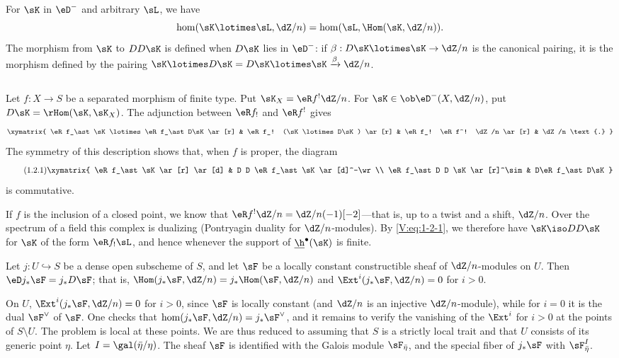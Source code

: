 \documentclass[oneside]{book}
\begin{document}
For $\sK$ in $\eD^-$ and arbitrary $\sL$, we have
\[
  \hom(\sK\lotimes \sL,\dZ/n) = \hom(\sL,\Hom(\sK,\dZ/n)) \text{.}
\]
The morphism from $\sK$ to $DD\sK$ is defined when $D\sK$ lies in $\eD^-$:
if $\beta:D\sK\lotimes\sK\to \dZ/n$ is the canonical pairing, it is the
morphism defined by the pairing
$\sK\lotimes D\sK=D\sK\lotimes \sK \xrightarrow\beta \dZ/n$.


\subsection{}\label{V:1-2}

Let $f:X\to S$ be a separated morphism of finite type. Put
$\sK_X=\eR f^!\dZ/n$. For $\sK\in \ob\eD^-(X,\dZ/n)$, put
$D\sK = \rHom(\sK,\sK_X)$. The adjunction between $\eR f_!$ and $\eR f^!$
gives
\[\xymatrix{
  \eR f_\ast \sK\lotimes \eR f_\ast D\sK \ar[r]
    & \eR f_! (\sK\lotimes D\sK) \ar[r]
    & \eR f_! \eR f^! \dZ/n \ar[r]
    & \dZ/n \text{.}
}\]
The symmetry of this description shows that, when $f$ is proper, the diagram
\begin{equation*}\tag{1.2.1}\label{V:eq:1-2-1}
\xymatrix{
  \eR f_\ast \sK \ar[r] \ar[d]
    & D D \eR f_\ast \sK \ar[d]^-\wr \\
  \eR f_\ast D D \sK \ar[r]^\sim
    & D\eR f_\ast D\sK
}
\end{equation*}
is commutative.

If $f$ is the inclusion of a closed point, we know that
$\eR f^!\dZ/n=\dZ/n(-1)[-2]$---that is, up to a twist and a shift, $\dZ/n$.
Over the spectrum of a field this complex is dualizing (Pontryagin duality
for $\dZ/n$-modules). By \eqref{V:eq:1-2-1}, we therefore have
$\sK\iso D D\sK$ for $\sK$ of the form $\eR f_!\sL$, and hence whenever the
support of $\underline\h^\bullet(\sK)$ is finite.


\begin{theorem_}\label{V:1-3}
Let $j:U\hookrightarrow S$ be a dense open subscheme of $S$, and let $\sF$
be a locally constant constructible sheaf of $\dZ/n$-modules on $U$. Then
$\eD j_\ast \sF = j_\ast D \sF$; that is,
$\Hom(j_\ast \sF,\dZ/n) = j_\ast\Hom(\sF,\dZ/n)$ and
$\Ext^i(j_\ast\sF,\dZ/n) = 0$ for $i>0$.
\end{theorem_}

On $U$, $\Ext^i(j_\ast\sF,\dZ/n)=0$ for $i>0$, since $\sF$ is locally
constant (and $\dZ/n$ is an injective $\dZ/n$-module), while for $i=0$ it is
the dual $\sF^\vee$ of $\sF$. One checks that
$\hom(j_\ast\sF,\dZ/n)=j_\ast\sF^\vee$, and it remains to verify the
vanishing of the $\Ext^i$ for $i>0$ at the points of $S\setminus U$. The
problem is local at these points. We are thus reduced to assuming that $S$
is a strictly local trait and that $U$ consists of its generic point $\eta$.
Let $I=\gal(\bar\eta/\eta)$. The sheaf $\sF$ is identified with the Galois
module $\sF_{\bar\eta}$, and the special fiber of $j_\ast \sF$ with
$\sF_{\bar\eta}^I$.
\end{document}
